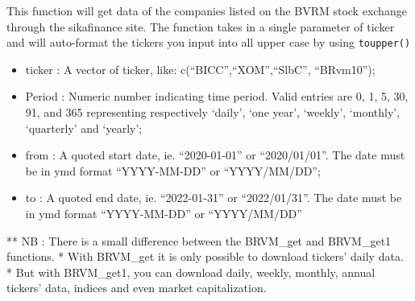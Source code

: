 \documentclass[
]{article}
\providecommand{\tightlist}{%
  \setlength{\itemsep}{0pt}\setlength{\parskip}{0pt}}
\begin{document}
This function will get data of the companies listed on the BVRM stock
exchange through the sikafinance site. The function takes in a single
parameter of ticker and will auto-format the tickers you input into all
upper case by using \texttt{toupper()}

\begin{itemize}
\tightlist
\item
  ticker : A vector of ticker, like: c(``BICC'',``XOM'',``SlbC'',
  ``BRvm10'');
\item
  Period : Numeric number indicating time period. Valid entries are 0,
  1, 5, 30, 91, and 365 representing respectively `daily', `one year',
  `weekly', `monthly', `quarterly' and `yearly';
\item
  from : A quoted start date, ie. ``2020-01-01'' or ``2020/01/01''. The
  date must be in ymd format ``YYYY-MM-DD'' or ``YYYY/MM/DD'';
\item
  to : A quoted end date, ie. ``2022-01-31'' or ``2022/01/31''. The date
  must be in ymd format ``YYYY-MM-DD'' or ``YYYY/MM/DD''
\end{itemize}

** NB : There is a small difference between the BRVM\_get and BRVM\_get1
functions. * With BRVM\_get it is only possible to download tickers'
daily data. * But with BRVM\_get1, you can download daily, weekly,
monthly, annual tickers' data, indices and even market capitalization.
\end{document}
